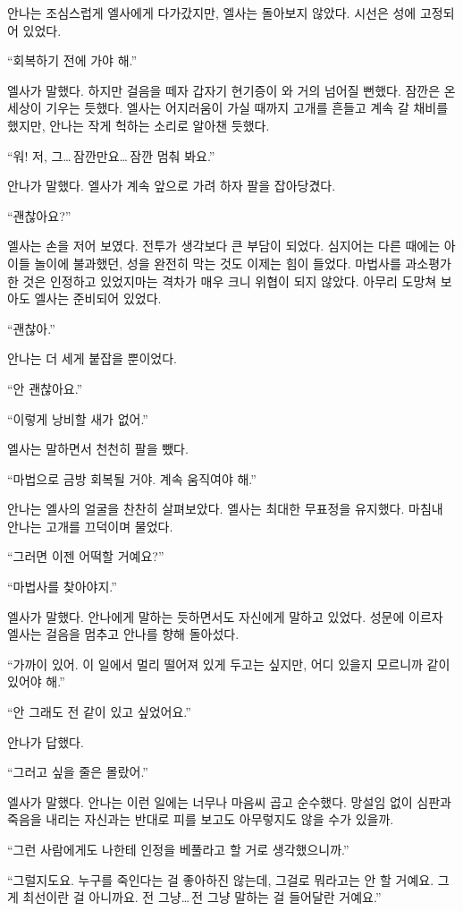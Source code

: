 안나는 조심스럽게 엘사에게 다가갔지만, 엘사는 돌아보지 않았다. 시선은 성에 고정되어 있었다.

``회복하기 전에 가야 해.''

엘사가 말했다. 하지만 걸음을 떼자 갑자기 현기증이 와 거의 넘어질 뻔했다. 잠깐은 온 세상이 기우는 듯했다. 엘사는 어지러움이 가실 때까지 고개를 흔들고 계속 갈 채비를 했지만, 안나는 작게 헉하는 소리로 알아챈 듯했다.

``워! 저, 그\ldots\,잠깐만요\ldots\,잠깐 멈춰 봐요.''

안나가 말했다. 엘사가 계속 앞으로 가려 하자 팔을 잡아당겼다.

``괜찮아요?''

엘사는 손을 저어 보였다. 전투가 생각보다 큰 부담이 되었다. 심지어는 다른 때에는 아이들 놀이에 불과했던, 성을 완전히 막는 것도 이제는 힘이 들었다. 마법사를 과소평가한 것은 인정하고 있었지마는 격차가 매우 크니 위협이 되지 않았다. 아무리 도망쳐 보아도 엘사는 준비되어 있었다.

``괜찮아.''

안나는 더 세게 붙잡을 뿐이었다.

``안 괜찮아요.''

``이렇게 낭비할 새가 없어.''

엘사는 말하면서 천천히 팔을 뺐다.

``마법으로 금방 회복될 거야. 계속 움직여야 해.''

안나는 엘사의 얼굴을 찬찬히 살펴보았다. 엘사는 최대한 무표정을 유지했다. 마침내 안나는 고개를 끄덕이며 물었다.

``그러면 이젠 어떡할 거예요?''

``마법사를 찾아야지.''

엘사가 말했다. 안나에게 말하는 듯하면서도 자신에게 말하고 있었다. 성문에 이르자 엘사는 걸음을 멈추고 안나를 향해 돌아섰다.

``가까이 있어. 이 일에서 멀리 떨어져 있게 두고는 싶지만, 어디 있을지 모르니까 같이 있어야 해.''

``안 그래도 전 같이 있고 싶었어요.''

안나가 답했다.

``그러고 싶을 줄은 몰랐어.''

엘사가 말했다. 안나는 이런 일에는 너무나 마음씨 곱고 순수했다. 망설임 없이 심판과 죽음을 내리는 자신과는 반대로 피를 보고도 아무렇지도 않을 수가 있을까.

``그런 사람에게도 나한테 인정을 베풀라고 할 거로 생각했으니까.''

``그럴지도요. 누구를 죽인다는 걸 좋아하진 않는데, 그걸로 뭐라고는 안 할 거예요. 그게 최선이란 걸 아니까요. 전 그냥\ldots\,전 그냥 말하는 걸 들어달란 거예요.''

